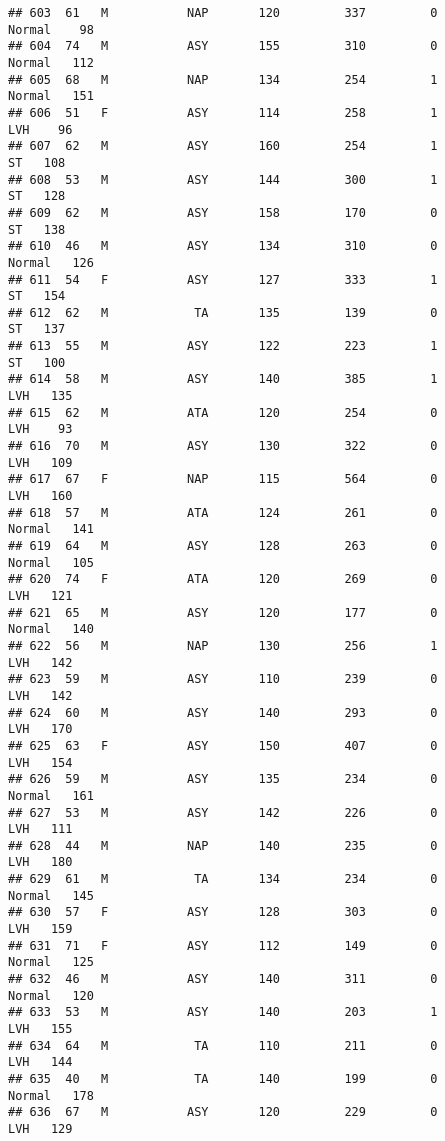 \documentclass[
]{article}
\begin{document}
\begin{verbatim}
## 603  61   M           NAP       120         337         0     Normal    98
## 604  74   M           ASY       155         310         0     Normal   112
## 605  68   M           NAP       134         254         1     Normal   151
## 606  51   F           ASY       114         258         1        LVH    96
## 607  62   M           ASY       160         254         1         ST   108
## 608  53   M           ASY       144         300         1         ST   128
## 609  62   M           ASY       158         170         0         ST   138
## 610  46   M           ASY       134         310         0     Normal   126
## 611  54   F           ASY       127         333         1         ST   154
## 612  62   M            TA       135         139         0         ST   137
## 613  55   M           ASY       122         223         1         ST   100
## 614  58   M           ASY       140         385         1        LVH   135
## 615  62   M           ATA       120         254         0        LVH    93
## 616  70   M           ASY       130         322         0        LVH   109
## 617  67   F           NAP       115         564         0        LVH   160
## 618  57   M           ATA       124         261         0     Normal   141
## 619  64   M           ASY       128         263         0     Normal   105
## 620  74   F           ATA       120         269         0        LVH   121
## 621  65   M           ASY       120         177         0     Normal   140
## 622  56   M           NAP       130         256         1        LVH   142
## 623  59   M           ASY       110         239         0        LVH   142
## 624  60   M           ASY       140         293         0        LVH   170
## 625  63   F           ASY       150         407         0        LVH   154
## 626  59   M           ASY       135         234         0     Normal   161
## 627  53   M           ASY       142         226         0        LVH   111
## 628  44   M           NAP       140         235         0        LVH   180
## 629  61   M            TA       134         234         0     Normal   145
## 630  57   F           ASY       128         303         0        LVH   159
## 631  71   F           ASY       112         149         0     Normal   125
## 632  46   M           ASY       140         311         0     Normal   120
## 633  53   M           ASY       140         203         1        LVH   155
## 634  64   M            TA       110         211         0        LVH   144
## 635  40   M            TA       140         199         0     Normal   178
## 636  67   M           ASY       120         229         0        LVH   129

\end{verbatim}
\end{document}
